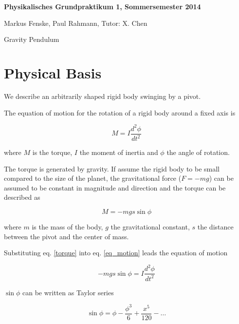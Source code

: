 \documentclass[a4paper,german,12pt,smallheadings]{scrartcl}
\begin{document}
\allowdisplaybreaks %
\begin{center}
\bfseries %
\sffamily %
\vspace{-40pt}
Physikalisches Grundpraktikum 1, Sommersemester 2014

Markus Fenske, Paul Rahmann, Tutor: X. Chen

Gravity Pendulum
\vspace{-10pt}
\end{center}

\section*{Physical Basis}

We describe an arbitrarily shaped rigid body swinging by a pivot.

The equation of motion for the rotation of a rigid body around a fixed axis is

\begin{equation}
  M = I \frac{d^2 \phi}{d t^2}
  \label{eq_motion}
\end{equation}

where $M$ is the torque, $I$ the moment of inertia and $\phi$ the angle of rotation.

The torque is generated by gravity. If assume the rigid body to be small
compared to the size of the planet, the gravitational force ($F = -mg$) can be
assumed to be constant in magnitude and direction  and the torque can be
described as

\begin{equation}
  M = -mg s \sin \phi
  \label{torque}
\end{equation}

where $m$ is the mass of the body, $g$ the gravitational constant, $s$ the
distance between the pivot and the center of mass.

Substituting eq. \ref{torque} into eq. \ref{eq_motion} leads the equation of
motion

\begin{equation}
  -mg s \sin \phi = I \frac{d^2 \phi}{d t^2}
  \label{diff_eq}
\end{equation}

$\sin \phi$ can be written as Taylor series

\begin{equation}
  \sin \phi = \phi - \frac{\phi^3}{6} + \frac{x^5}{120} - \dots
\end{equation}
\end{document}
